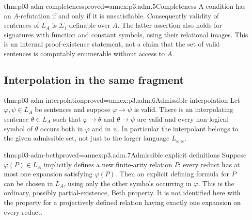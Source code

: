 \begin{hbtheorem}{thm:p03-adm-completeness}{proved=annex:p3.adm.5}{Completeness}
A condition has an \(A\)-refutation if and only if it is unsatisfiable.
Consequently validity of sentences of \(L_A\) is \(\Sigma_1\)-definable
over \(A\). The latter assertion also holds for signatures with
function and constant symbols, using their relational images.
This is an internal proof-existence statement, not a claim that the set
of valid sentences is computably enumerable without access to \(A\).
\end{hbtheorem}

\subsection{Interpolation in the same fragment}

\begin{hbtheorem}{thm:p03-adm-interpolation}{proved=annex:p3.adm.6}{Admissible interpolation}
Let \(\varphi,\psi\in L_A\) be sentences and suppose
\(\varphi\to\psi\) is valid. There is an interpolating sentence
\(\theta\in L_A\) such that \(\varphi\to\theta\) and
\(\theta\to\psi\) are valid and every non-logical symbol of \(\theta\)
occurs both in \(\varphi\) and in \(\psi\).
In particular the interpolant belongs to the given admissible set,
not just to the larger language \(L_{\omega_1\omega}\).
\end{hbtheorem}

\begin{hbcorollary}{thm:p03-adm-beth}{proved=annex:p3.adm.7}{Admissible explicit definitions}
Suppose \(\varphi(P)\in L_A\) implicitly defines a new finite-arity
relation \(P\): every reduct has at most one expansion satisfying
\(\varphi(P)\). Then an explicit defining formula for \(P\) can be
chosen in \(L_A\), using only the other symbols occurring in
\(\varphi\). This is the ordinary, possibly partial-existence, Beth
property. It is not identified here with the property for a projectively
defined relation having exactly one expansion on every reduct.
\end{hbcorollary}
